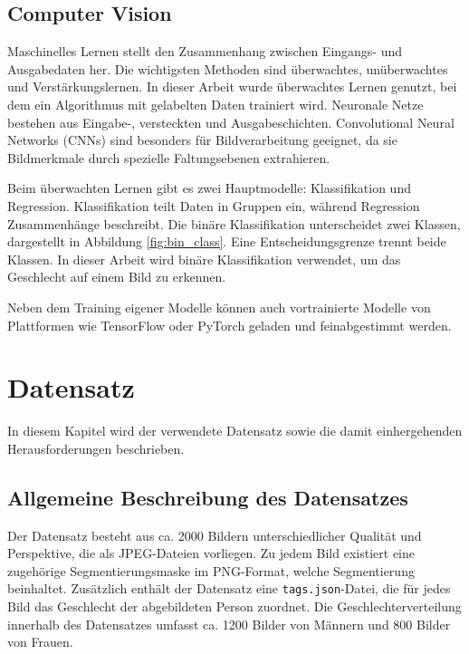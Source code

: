 \documentclass[journal,twoside,web]{ieeecolor}
\begin{document}
\subsection{Computer Vision}
\label{sec:computer_vision} 
Maschinelles Lernen stellt den Zusammenhang zwischen Eingangs- und Ausgabedaten her. Die wichtigsten Methoden sind überwachtes, unüberwachtes und Verstärkungslernen. In dieser Arbeit wurde überwachtes Lernen genutzt, bei dem ein Algorithmus mit gelabelten Daten trainiert wird. Neuronale Netze bestehen aus Eingabe-, versteckten und Ausgabeschichten. Convolutional Neural Networks (CNNs) sind besonders für Bildverarbeitung geeignet, da sie Bildmerkmale durch spezielle Faltungsebenen extrahieren.

Beim überwachten Lernen gibt es zwei Hauptmodelle: Klassifikation und Regression. Klassifikation teilt Daten in Gruppen ein, während Regression Zusammenhänge beschreibt. Die binäre Klassifikation unterscheidet zwei Klassen, dargestellt in Abbildung \ref{fig:bin_class}. Eine Entscheidungsgrenze trennt beide Klassen. In dieser Arbeit wird binäre Klassifikation verwendet, um das Geschlecht auf einem Bild zu erkennen.

Neben dem Training eigener Modelle können auch vortrainierte Modelle von Plattformen wie TensorFlow oder PyTorch geladen und feinabgestimmt werden.


\section{Datensatz} 
\label{sec:dataset}
In diesem Kapitel wird der verwendete Datensatz sowie die damit einhergehenden Herausforderungen beschrieben.

\subsection{Allgemeine Beschreibung des Datensatzes}
\label{sec:dataset_description}
Der Datensatz besteht aus ca. 2000 Bildern unterschiedlicher Qualität und Perspektive, die als JPEG-Dateien vorliegen. Zu jedem Bild existiert eine zugehörige Segmentierungsmaske im PNG-Format, welche Segmentierung beinhaltet. Zusätzlich enthält der Datensatz eine \texttt{tags.json}-Datei, die für jedes Bild das Geschlecht der abgebildeten Person zuordnet. Die Geschlechterverteilung innerhalb des Datensatzes umfasst ca. 1200 Bilder von Männern und 800 Bilder von Frauen.
\end{document}
